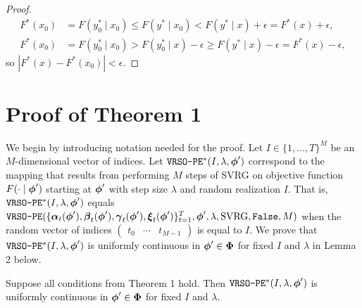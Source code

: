\begin{proof}
    \begin{align*}
        F^*(x_0) &= F(y_0^* \mid x_0) \leq F(y^* \mid x_0) < F(y^* \mid x) + \epsilon = F^*(x) + \epsilon, \\ 
        F^*(x_0) &= F(y_0^* \mid x_0) > F(y_0^* \mid x) - \epsilon \geq F(y^* \mid x) - \epsilon = F^*(x) - \epsilon,
    \end{align*}
    so $|F^*(x) - F^*(x_0)| < \epsilon$.
\end{proof}

\section{Proof of Theorem 1}

We begin by introducing notation needed for the proof. Let $I \in \{1,\ldots,T\}^M$ be an $M$-dimensional vector of indices. Let $\texttt{VRSO-PE}^*(I,\lambda,\boldsymbol{\phi}')$ correspond to the mapping that results from performing $M$ steps of SVRG on objective function $F(\cdot \mid \boldsymbol{\phi}')$ starting at $\boldsymbol{\phi}'$ with step size $\lambda$ and random realization $I$. That is, $\texttt{VRSO-PE}^*(I,\lambda,\boldsymbol{\phi}')$ equals $\texttt{VRSO-PE}(\{\boldsymbol{\alpha}_t(\boldsymbol{\phi}'),\boldsymbol{\beta}_t(\boldsymbol{\phi}'),\boldsymbol{\gamma}_t(\boldsymbol{\phi}'),\boldsymbol{\xi}_t(\boldsymbol{\phi}')\}_{t=1}^{T}, \boldsymbol{\phi}', \lambda, \text{SVRG}, \texttt{False}, M)$ when the random vector of indices $\begin{pmatrix} t_0 & \cdots & t_{M-1} \end{pmatrix}$ is equal to $I$. We prove that $\texttt{VRSO-PE}^*(I,\lambda,\boldsymbol{\phi}')$ is uniformly continuous in $\boldsymbol{\phi}' \in \boldsymbol{\Phi}$ for fixed $I$ and $\lambda$ in Lemma 2 below.

\begin{lemma}
    Suppose all conditions from Theorem 1 hold. Then $\texttt{VRSO-PE}^*(I,\lambda,\boldsymbol{\phi}')$ is uniformly continuous in $\boldsymbol{\phi}' \in \boldsymbol{\Phi}$ for fixed $I$ and $\lambda$.
\end{lemma}

